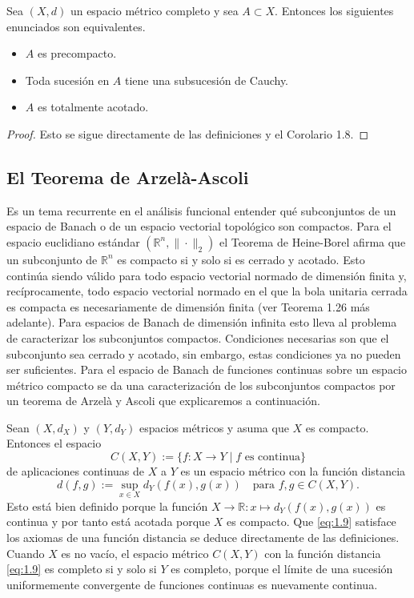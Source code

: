 \begin{corollary}\label{cor:1.9}
Sea $(X, d)$ un espacio métrico completo y sea $A\subset X$. Entonces los siguientes enunciados son equivalentes.
\begin{itemize}
    \item[(i)] $A$ es precompacto.
    \item[(ii)] Toda sucesión en $A$ tiene una subsucesión de Cauchy.
    \item[(iii)] $A$ es totalmente acotado.
\end{itemize}
\end{corollary}
\begin{proof}
Esto se sigue directamente de las definiciones y el Corolario 1.8.
\end{proof}

\subsection{El Teorema de Arzelà-Ascoli}

Es un tema recurrente en el análisis funcional entender qué subconjuntos de un espacio de Banach o de un espacio vectorial topológico son compactos. Para el espacio euclidiano estándar $(\mathbb{R}^{n},\|\cdot\|_{2})$ el Teorema de Heine-Borel afirma que un subconjunto de $\mathbb{R}^{n}$ es compacto si y solo si es cerrado y acotado. Esto continúa siendo válido para todo espacio vectorial normado de dimensión finita y, recíprocamente, todo espacio vectorial normado en el que la bola unitaria cerrada es compacta es necesariamente de dimensión finita (ver Teorema 1.26 más adelante). Para espacios de Banach de dimensión infinita esto lleva al problema de caracterizar los subconjuntos compactos. Condiciones necesarias son que el subconjunto sea cerrado y acotado, sin embargo, estas condiciones ya no pueden ser suficientes. Para el espacio de Banach de funciones continuas sobre un espacio métrico compacto se da una caracterización de los subconjuntos compactos por un teorema de Arzelà y Ascoli que explicaremos a continuación.

Sean $(X,d_{X})$ y $(Y,d_{Y})$ espacios métricos y asuma que $X$ es compacto. Entonces el espacio
\[ C(X,Y) := \{f : X \rightarrow Y \mid f \text{ es continua}\} \]
de aplicaciones continuas de $X$ a $Y$ es un espacio métrico con la función distancia
\begin{equation}\label{eq:1.9}
d(f,g) := \sup_{x\in X}d_{Y}(f(x),g(x)) \quad \text{para } f,g\in C(X,Y).
\end{equation}
Esto está bien definido porque la función $X\rightarrow\mathbb{R}:x\mapsto d_{Y}(f(x),g(x))$ es continua y por tanto está acotada porque $X$ es compacto. Que \eqref{eq:1.9} satisface los axiomas de una función distancia se deduce directamente de las definiciones. Cuando $X$ es no vacío, el espacio métrico $C(X,Y)$ con la función distancia \eqref{eq:1.9} es completo si y solo si $Y$ es completo, porque el límite de una sucesión uniformemente convergente de funciones continuas es nuevamente continua.


